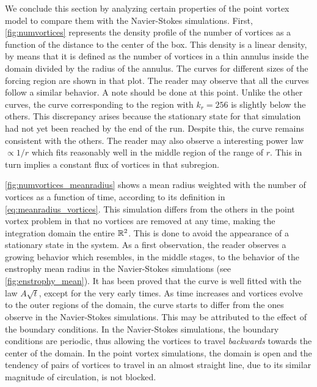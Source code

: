 \documentclass[../main.tex]{subfiles}
\begin{document}
We conclude this section by analyzing certain properties of the point vortex model to compare them with the Navier-Stokes simulations. First, \cref{fig:numvortices} represents the density profile of the number of vortices as a function of the distance to the center of the box. This density is a linear density, by means that it is defined as the number of vortices in a thin annulus inside the domain divided by the radius of the annulus. The curves for different sizes of the forcing region are shown in that plot. The reader may observe that all the curves follow a similar behavior. A note should be done at this point. Unlike the other curves, the curve corresponding to the region with $k_r=256$ is slightly below the others. This discrepancy arises because the stationary state for that simulation had not yet been reached by the end of the run. Despite this, the curve remains consistent with the others. The reader may also observe a interesting power law $\propto 1/r$ which fits reasonably well in the middle region of the range of $r$. This in turn implies a constant flux of vortices in that subregion.

\cref{fig:numvortices_meanradius} shows a mean radius weighted with the number of vortices as a function of time, according to its definition in \cref{eq:meanradius_vortices}. This simulation differs from the others in the point vortex problem in that no vortices are removed at any time, making the integration domain the entire $\mathbb{R}^2$. This is done to avoid the appearance of a stationary state in the system. As a first observation, the reader observes a growing behavior which resembles, in the middle stages, to the behavior of the enstrophy mean radius in the Navier-Stokes simulations (see \cref{fig:enstrophy_mean}). It has been proved that the curve is well fitted with the law $A\sqrt{t}$, except for the very early times. As time increases and vortices evolve to the outer regions of the domain, the curve starts to differ from the ones observe in the Navier-Stokes simulations. This may be attributed to the effect of the boundary conditions. In the Navier-Stokes simulations, the boundary conditions are periodic, thus allowing the vortices to travel \emph{backwards} towards the center of the domain. In the point vortex simulations, the domain is open and the tendency of pairs of vortices to travel in an almost straight line, due to its similar magnitude of circulation, is not blocked.
\end{document}
